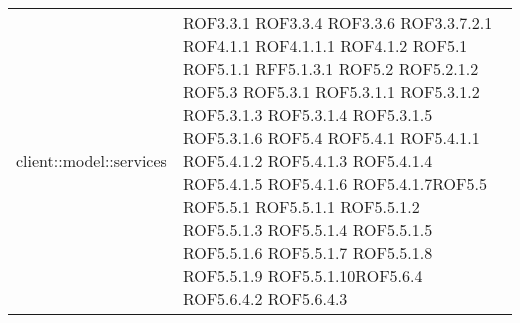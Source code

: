 \begin{center}
\begin{longtable}{| p{9cm} | p{4cm} |}
client::model::services  & ROF3.3.1 \newline ROF3.3.4 \newline ROF3.3.6 \newline ROF3.3.7.2.1 \newline ROF4.1.1 \newline ROF4.1.1.1 \newline ROF4.1.2 \newline ROF5.1 \newline ROF5.1.1 \newline RFF5.1.3.1 \newline ROF5.2 \newline ROF5.2.1.2 \newline ROF5.3 \newline ROF5.3.1 \newline ROF5.3.1.1 \newline ROF5.3.1.2 \newline ROF5.3.1.3 \newline ROF5.3.1.4 \newline ROF5.3.1.5 \newline ROF5.3.1.6 \newline ROF5.4 \newline ROF5.4.1 \newline ROF5.4.1.1 \newline ROF5.4.1.2 \newline ROF5.4.1.3 \newline ROF5.4.1.4 \newline ROF5.4.1.5 \newline ROF5.4.1.6  \newline ROF5.4.1.7\newline ROF5.5 \newline ROF5.5.1 \newline ROF5.5.1.1 \newline ROF5.5.1.2 \newline ROF5.5.1.3 \newline ROF5.5.1.4 \newline ROF5.5.1.5 \newline ROF5.5.1.6  \newline ROF5.5.1.7 \newline ROF5.5.1.8 \newline ROF5.5.1.9 \newline ROF5.5.1.10\newline ROF5.6.4 \newline ROF5.6.4.2 \newline ROF5.6.4.3 \\

\end{longtable}
\end{center}
